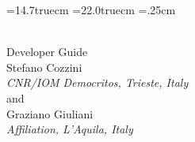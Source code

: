 \hsize=14.7truecm
\vsize=22.0truecm
\hoffset=.25cm
\voffset=7cm

\begin{center}
{\Huge \PR } \\
{\Large Developer Guide } \\
\vspace{2cm}
{\large Stefano Cozzini } \\
{\em CNR/IOM  Democritos, Trieste, Italy} \\
{ and } \\
{\large Graziano Giuliani  } \\
{\em  Affiliation, L'Aquila, Italy} \\
\end{center}

\date{}
